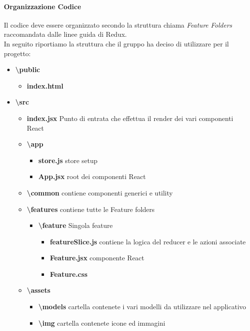 	\paragraph{Organizzazione Codice}
	Il codice deve essere organizzato secondo la struttura chiama \textit{Feature Folders} raccomandata dalle linee guida di Redux.\\
	In seguito riportiamo la struttura che il gruppo ha deciso di utilizzare per il progetto:
	\begin{itemize}
		\item \textbf{\textbackslash public}
			\begin{itemize}
				\item \textbf{index.html} 
			\end{itemize}
		\item \textbf{\textbackslash src} 
			\begin{itemize}
				\item \textbf{index.jsx} Punto di entrata che effettua il render dei vari componenti React
				\item 	\textbf{\textbackslash app}
					\begin{itemize}
						\item \textbf{store.js} store setup
						\item \textbf{App.jsx} root dei componenti React
					\end{itemize}
				\item \textbf{\textbackslash common} contiene componenti generici e utility
			 	\item \textbf{\textbackslash features} contiene tutte le Feature folders
			 	\begin{itemize}
			 		\item \textbf{\textbackslash feature} Singola feature
			 		\begin{itemize}
			 			\item \textbf{featureSlice.js} contiene la logica del reducer e le azioni associate
			 			\item \textbf{Feature.jsx} componente React
			 			\item \textbf{Feature.css}
			 		\end{itemize}
			  \end{itemize}
			  \item \textbf{\textbackslash assets}
					\begin{itemize}
						\item \textbf{\textbackslash models} cartella contenete i vari modelli da utilizzare nel applicativo
						\item \textbf{\textbackslash img} cartella contenete icone ed immagini
					\end{itemize}
			\end{itemize}
\end{itemize}				
	
